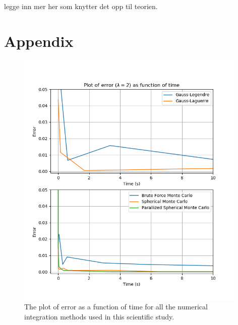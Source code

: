 \documentclass{article}
\begin{document}
legge inn mer her som knytter det opp til teorien.


\vspace{1cm}

\section{Appendix} \label{sec:Appendix}


\begin{figure}[ht]
\centering
\includegraphics[width = 11cm]{images/method-timings-small.png}
\caption{The plot of error as a function of time for all the numerical integration methods used in this scientific study. }
\label{fig:timingssmallpng}
\end{figure}
\end{document}
